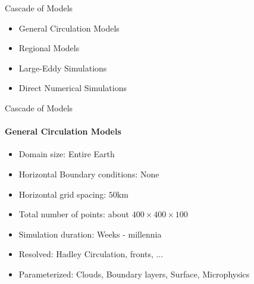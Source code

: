 \begin{frame}[<+->]{Cascade of Models}
 \begin{itemize}
  \item General Circulation Models
  \item Regional Models
  \item \alert{Large-Eddy Simulations}
  \item Direct Numerical Simulations
 \end{itemize}

\end{frame}
\begin{frame}[<+->]{Cascade of Models}
\framesubtitle{General Circulation Models}
\begin{itemize}
 \item Domain size: Entire Earth
 \item Horizontal Boundary conditions: None
 \item Horizontal grid spacing: $50 \mathrm{km}$
 \item Total number of points: about $400 \times 400 \times 100 $
 \item Simulation duration: Weeks - millennia
 \item Resolved: Hadley Circulation, fronts, ...
 \item Parameterized: Clouds,  Boundary layers, Surface, Microphysics
\end{itemize}
 
\end{frame}

